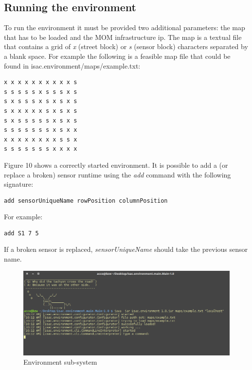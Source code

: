 \documentclass[11pt]{article}
\begin{document}
\subsection{Running the environment}
To run the environment it must be provided two additional parameters: the map that has to be loaded and the MOM infrastructure ip. The map is a textual file that contains a grid of \emph{x} (street block) or \emph{s} (sensor block) characters separated by a blank space. For example the following is a feasible map file that could be found in isac.environment/maps/example.txt:
\begin{verbatim}
x x x x x x x x x x s
s s s s s x s s s x s
s x s s s x s x s x s
s x x x x x s x s x s
s x s s s s s x s x s
s s s s s s s x s x x
x x x x x x x x s s x
s s s s s s s x x x x
\end{verbatim}
Figure 10 shows a correctly started environment. It is possible to add a (or replace a broken) sensor runtime using the \emph{add} command with the following signature:
\begin{verbatim}
add sensorUniqueName rowPosition columnPosition
\end{verbatim}
For example:
\begin{verbatim}
add S1 7 5
\end{verbatim}
If a broken sensor is replaced, \emph{sensorUniqueName} should take the previous sensor name.
\begin{figure}
  \centering
	\includegraphics[scale=0.5]{envScreen}
  \caption{Environment sub-system}
\end{figure}
\end{document}
